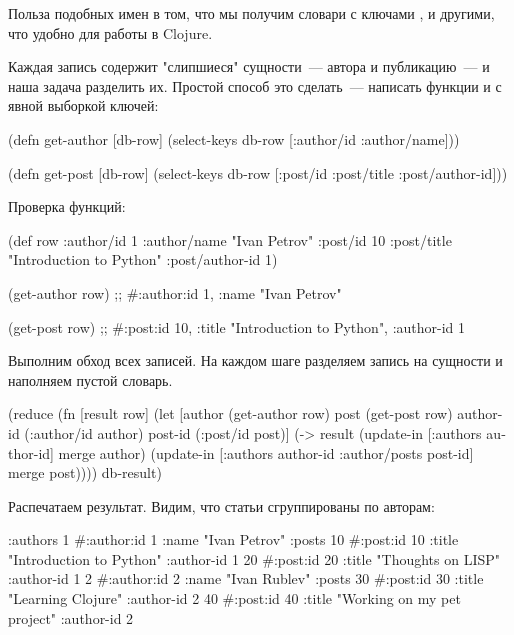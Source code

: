 Польза подобных имен в том, что мы получим словари с ключами ,  и другими, что удобно для работы в Clojure.

Каждая запись содержит "слипшиеся" сущности~--- автора и публикацию~--- и наша задача разделить их. Простой способ это сделать~--- написать функции  и  с явной выборкой ключей:

\begin{english}
  \begin{clojure}
(defn get-author [db-row]
  (select-keys db-row [:author/id :author/name]))

(defn get-post [db-row]
  (select-keys db-row [:post/id :post/title :post/author-id]))
  \end{clojure}
\end{english}

Проверка функций:

\begin{english}
  \begin{clojure}
(def row
  {:author/id 1
   :author/name "Ivan Petrov"
   :post/id 10
   :post/title "Introduction to Python"
   :post/author-id 1})

(get-author row)
;; #:author{:id 1, :name "Ivan Petrov"}

(get-post row)
;; #:post{:id 10, :title "Introduction to Python", :author-id 1}
  \end{clojure}
\end{english}

Выполним обход всех записей. На каждом шаге разделяем запись на сущности и наполняем пустой словарь.

\begin{english}
  \begin{clojure}
(reduce
 (fn [result row]
   (let [author    (get-author row)
         post      (get-post row)
         author-id (:author/id author)
         post-id   (:post/id post)]
     (-> result
         (update-in [:authors author-id] merge author)
         (update-in [:authors author-id :author/posts post-id] merge post))))
 {}
 db-result)
  \end{clojure}
\end{english}

Распечатаем результат. Видим, что статьи сгруппированы по авторам:

\begin{english}
  \begin{clojure}
{:authors
 {1 #:author{:id 1
             :name "Ivan Petrov"
             :posts {10 #:post{:id 10 :title "Introduction to Python" :author-id 1}
                     20 #:post{:id 20 :title "Thoughts on LISP" :author-id 1}}}
  2 #:author{:id 2
             :name "Ivan Rublev"
             :posts {30 #:post{:id 30 :title "Learning Clojure" :author-id 2}
                     40 #:post{:id 40 :title "Working on my pet project" :author-id 2}}}}}
  \end{clojure}
\end{english}


